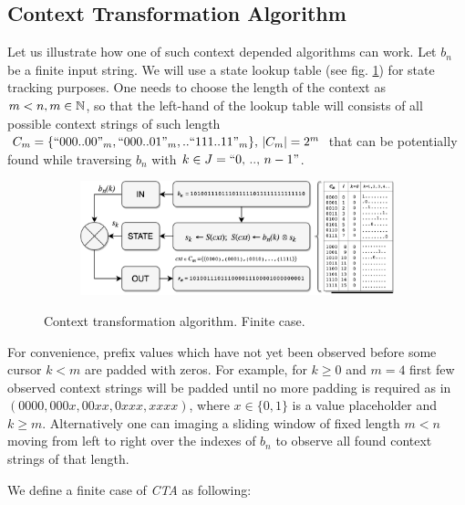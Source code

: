 \subsection{Context Transformation Algorithm}

Let us illustrate how one of such context depended algorithms can work. Let $b_n$ be a finite input string. We will use a state lookup table (see fig. \ref{fig:cta}) for state tracking purposes. One needs to choose the length of the context as $m < n, m \in \mathbb{N}$, so that the left-hand of the lookup table will consists of all possible context strings of such length $C_m = \{\text{``} 000..00\text{''}_m, \text{``} 000..01\text{''}_m, .. \\ \text{``} 111..11\text{''}_m\},\, |C_m| = 2^m$ that can be potentially found while traversing $b_n$ with $k \in J = \text{``} 0,\,..,\,n-1\text{''}$. 

\begin{figure}[h!]
  \centering
  \begin{subfigure}[b]{0.9\linewidth}
    \includegraphics[width=\linewidth]{appendix/CTA.png}
  \end{subfigure}
  \caption{Context transformation algorithm. Finite case.}
  \label{fig:cta}
\end{figure}

For convenience, prefix values which have not yet been observed before some cursor $k < m$ are padded with zeros. For example, for $k \geq 0$ and $m=4$ first few observed context strings will be padded until no more padding is required as in $(0000, 000x, 00xx, 0xxx, xxxx)$, where $x \in \{0,1\}$ is a value placeholder and $k \geq m$. Alternatively one can imaging a sliding window of fixed length $m < n$ moving from left to right over the indexes of $b_n$ to observe all found context strings of that length.

We define a finite case of \textit{CTA} as following: 

